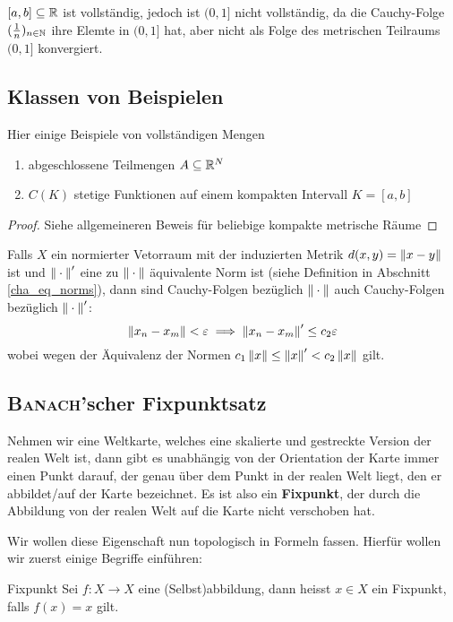 \begin{example}
$[a, b] \subseteq \mathbb{R}$ ist vollständig, jedoch ist $(0,1]$ nicht vollständig, da die Cauchy-Folge $(\frac{1}{n})_{n \in \mathbb{N}}$ ihre Elemte in $(0,1]$ hat, aber nicht als Folge des metrischen Teilraums $(0,1]$ konvergiert.
\end{example}

\subsection{Klassen von Beispielen}
Hier einige Beispiele von vollständigen Mengen 
\begin{enumerate}
    \item abgeschlossene Teilmengen $A \subseteq \mathbb{R}^N$
    \item $C(K)$ stetige Funktionen auf einem kompakten Intervall $K = [a,b]$
\end{enumerate}
\begin{proof}
Siehe allgemeineren Beweis für beliebige kompakte metrische Räume 
\end{proof}

\begin{remark}
Falls $X$ ein normierter Vetorraum mit der induzierten Metrik $d(x,y) = \left\|x-y\right\|$ ist und $\left\|\:\cdot\:\right\|'$ eine zu $\left\|\:\cdot\:\right\|$ äquivalente Norm ist (siehe Definition in Abschnitt \ref{cha_eq_norms}), dann sind Cauchy-Folgen bezüglich $\left\|\:\cdot\:\right\|$ auch Cauchy-Folgen bezüglich $\left\|\:\cdot\:\right\|'$:
$$\left\|x_n-x_m\right\| < \varepsilon \implies \left\|x_n-x_m\right\|' \leq c_2 \varepsilon$$
wobei wegen der Äquivalenz der Normen $c_1 \left\|x\right\| \leq \left\|x\right\|' < c_2 \left\|x\right\|$ gilt. 
\end{remark}

\subsection{\textsc{Banach}'scher Fixpunktsatz}
Nehmen wir eine Weltkarte, welches eine skalierte und gestreckte Version der realen Welt ist, dann gibt es unabhängig von der Orientation der Karte immer einen Punkt darauf, der genau über dem Punkt in der realen Welt liegt, den er abbildet/auf der Karte bezeichnet. Es ist also ein \textbf{Fixpunkt}, der durch die Abbildung von der realen Welt auf die Karte nicht verschoben hat.

Wir wollen diese Eigenschaft nun topologisch in Formeln fassen. Hierfür wollen wir zuerst einige Begriffe einführen:

\begin{definition}{Fixpunkt}{}
Sei $f: X \to X$ eine (Selbst)abbildung, dann heisst $x \in X$ ein Fixpunkt, falls $f(x) =x$ gilt.
\end{definition}

